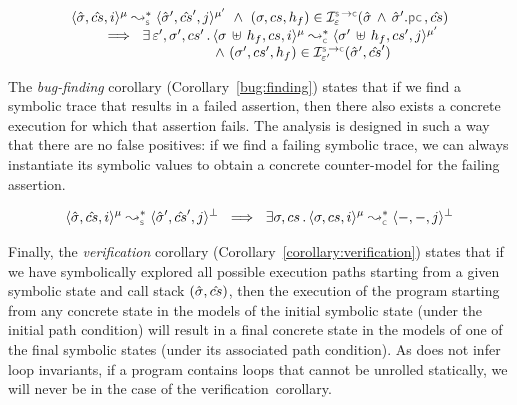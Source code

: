 \vspace*{-0.1cm}
\begin{theorem}\label{teo:soundness:jsil:symb:exe}
$$
\begin{array}{l}
\transabssemrule{\sstate, \scs, i}{\sstate', \scs', j}{\mode}{\mode'}{\symbolic} 
    \ \wedge \ (\jstate, \cs, \heap_f) \in \interpret{\symbconc}{\senv}(\sstate \, \wedge \, \sstate'.\pcsel, \scs) \\ \quad \quad 
    \ \implies \ \exists \, \senv', \jstate', \cs' \, . \, 
        \transabssemrule{\jstate \dunion \heap_f, \cs, i}{\jstate' \dunion \heap_f, \cs', j}{\mode}{\mode'}{\concrete} \\ \quad \quad \quad \quad \quad \quad \quad \quad \quad \quad 
               \ \wedge \ (\jstate', \cs', \heap_f) \in \interpret{\symbconc}{\senv'}(\sstate', \scs')
\end{array}
$$
\end{theorem}

The \emph{bug-finding} corollary (Corollary~\ref{bug:finding}) states that if 
we find a symbolic trace that results in a failed assertion, 
then there also exists a concrete execution for which that assertion fails.
The analysis is designed in such a way that there are no false positives: 
if we find a failing symbolic trace,
we can always instantiate its symbolic values to obtain a concrete counter-model for the 
failing assertion. %

\vspace*{-0.1cm}
\begin{corollary}\label{bug:finding}
$$
\transabssemrule{\sstate, \scs, i}{\sstate', \scs', j}{\mode}{\bot}{\symbolic}  
      \ \implies \  \exists \jstate, \cs \, . \, \transabssemrule{\jstate, \cs, i}{-, -, j}{\mode}{\bot}{\concrete} 
$$
\end{corollary}

Finally, the \emph{verification} corollary (Corollary~\ref{corollary:verification})
states that if we have symbolically explored all possible execution paths
starting from a given symbolic state and call stack $(\hat{\sigma}, \hat{cs})$,  
then the execution of the program starting from any concrete state in the models 
of the initial symbolic state (under the initial path condition) will result in a final concrete state
in the models of one of the final symbolic states (under its associated path condition).  
As \cosette does not infer loop invariants, if a program contains loops that cannot be unrolled statically, we will never be in the case of the verification~corollary. 

